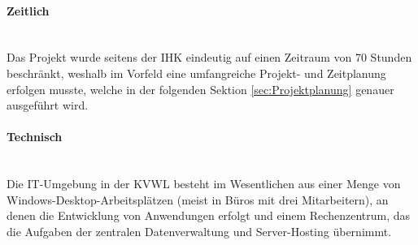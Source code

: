 \paragraph{Zeitlich} ~\\
\label{p:Randbedingungen:Zeitlich}
Das Projekt wurde seitens der IHK eindeutig auf einen Zeitraum von 70 Stunden beschränkt, weshalb im Vorfeld eine umfangreiche Projekt- und Zeitplanung erfolgen musste, welche in der folgenden Sektion \ref{sec:Projektplanung} genauer ausgeführt wird.

\paragraph{Technisch} ~\\
\label{p:Randbedingungen:Technisch}
Die IT-Umgebung in der \ac{KVWL} besteht im Wesentlichen aus einer Menge von Windows-Desktop-Arbeitsplätzen (meist in Büros mit \ca drei Mitarbeitern), an denen die Entwicklung von Anwendungen erfolgt und einem Rechenzentrum, das die Aufgaben der zentralen Datenverwaltung und Server-Hosting übernimmt.